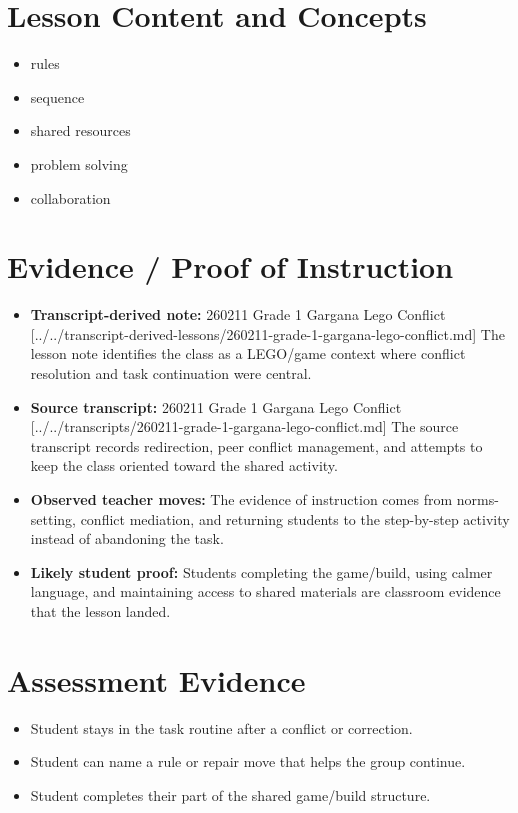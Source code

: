 \documentclass[11pt]{article}
\begin{document}
\section*{Lesson Content and Concepts}
\begin{itemize}[leftmargin=*]
\item rules
\item sequence
\item shared resources
\item problem solving
\item collaboration
\end{itemize}

\section*{Evidence / Proof of Instruction}
\begin{itemize}[leftmargin=*]
\item \textbf{Transcript-derived note:} 260211 Grade 1 Gargana Lego Conflict [../../transcript-derived-lessons/260211-grade-1-gargana-lego-conflict.md] The lesson note identifies the class as a LEGO/game context where conflict resolution and task continuation were central.
\item \textbf{Source transcript:} 260211 Grade 1 Gargana Lego Conflict [../../transcripts/260211-grade-1-gargana-lego-conflict.md] The source transcript records redirection, peer conflict management, and attempts to keep the class oriented toward the shared activity.
\item \textbf{Observed teacher moves:} The evidence of instruction comes from norms-setting, conflict mediation, and returning students to the step-by-step activity instead of abandoning the task.
\item \textbf{Likely student proof:} Students completing the game/build, using calmer language, and maintaining access to shared materials are classroom evidence that the lesson landed.
\end{itemize}

\section*{Assessment Evidence}
\begin{itemize}[leftmargin=*]
\item Student stays in the task routine after a conflict or correction.
\item Student can name a rule or repair move that helps the group continue.
\item Student completes their part of the shared game/build structure.
\end{itemize}
\end{document}
